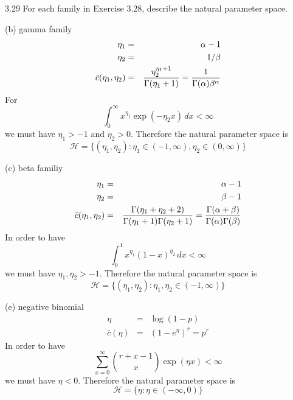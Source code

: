 \documentclass[12pt]{article}
\begin{document}
3.29
For each family in Exercise 3.28, describe the natural parameter
space.

\bigskip
\noindent
(b) gamma family
\begin{eqnarray*}
\eta_1&=&\alpha-1\\
\eta_2&=&1/\beta\\
\bar c(\eta_1,\eta_2)&=&{\eta_2^{\eta_1+1}\over\Gamma(\eta_1+1)}
={1\over\Gamma(\alpha)\beta^\alpha}
\end{eqnarray*}
For
$$\int_0^\infty x^{\eta_1}\exp(-\eta_2x)\,dx<\infty$$
we must have $\eta_1>-1$ and $\eta_2>0$.
Therefore the natural parameter space is
$${\mathscr H}=\{(\eta_1,\eta_2):\eta_1\in(-1,\infty),\eta_2\in(0,\infty)\}$$

\bigskip
\noindent
(c) beta familiy
\begin{eqnarray*}
\eta_1&=&\alpha-1\\
\eta_2&=&\beta-1\\
\bar c(\eta_1,\eta_2)&=&
{\Gamma(\eta_1+\eta_2+2)\over\Gamma(\eta_1+1)\Gamma(\eta_2+1)}
={\Gamma(\alpha+\beta)\over\Gamma(\alpha)\Gamma(\beta)}
\end{eqnarray*}
In order to have
$$\int_0^1 x^{\eta_1}(1-x)^{\eta_2}\,dx<\infty$$
we must have $\eta_1,\eta_2>-1$.
Therefore the natural parameter space is
$$\mathscr H=\{(\eta_1,\eta_2):\eta_1,\eta_2\in(-1,\infty)\}$$

\bigskip
\noindent
(e) negative binomial
\begin{eqnarray*}
\eta&=&\log(1-p)\\
\bar c(\eta)&=&(1-e^\eta)^r=p^r
\end{eqnarray*}
In order to have
$$\sum_{x=0}^\infty {r+x-1\choose x}\exp(\eta x)<\infty$$
we must have $\eta<0$.
Therefore the natural parameter space is
$$\mathscr H=\{\eta:\eta\in(-\infty,0)\}$$
\end{document}
